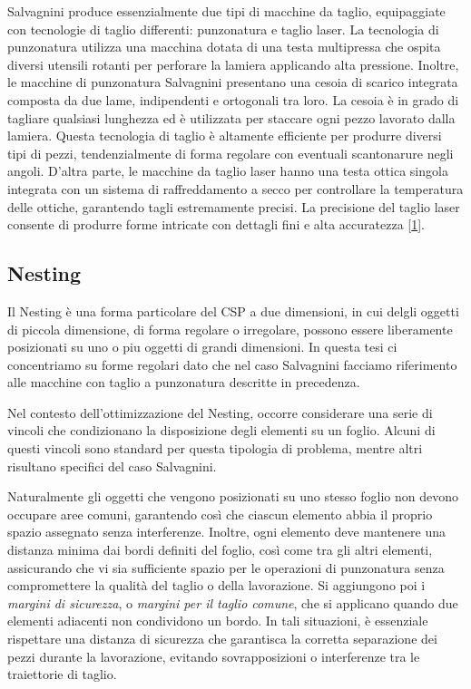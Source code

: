 Salvagnini produce essenzialmente due tipi di macchine da taglio, equipaggiate con tecnologie di taglio differenti: punzonatura e taglio laser. La tecnologia di punzonatura utilizza una macchina dotata di una testa multipressa che ospita diversi utensili rotanti per perforare la lamiera applicando alta pressione. Inoltre, le macchine di punzonatura Salvagnini presentano una cesoia di scarico integrata composta da due lame, indipendenti e ortogonali tra loro. La cesoia è in grado di tagliare qualsiasi lunghezza ed è utilizzata per staccare ogni pezzo lavorato dalla lamiera. Questa tecnologia di taglio è altamente efficiente per produrre diversi tipi di pezzi, tendenzialmente di forma regolare con eventuali scantonarure negli angoli. D'altra parte, le macchine da taglio laser hanno una testa ottica singola integrata con un sistema di raffreddamento a secco per controllare la temperatura delle ottiche, garantendo tagli estremamente precisi. La precisione del taglio laser consente di produrre forme intricate con dettagli fini e alta accuratezza [\hyperlink{bibliografia}{1}].


\subsection{Nesting}

Il Nesting è una forma particolare del CSP a due dimensioni, in cui delgli oggetti di piccola dimensione, di forma regolare o irregolare, possono essere liberamente posizionati su uno o piu oggetti di grandi dimensioni. In questa tesi ci concentriamo su forme regolari dato che nel caso Salvagnini facciamo riferimento alle macchine con taglio a punzonatura descritte in precedenza. 

Nel contesto dell’ottimizzazione del Nesting, occorre considerare una serie di vincoli che condizionano la disposizione degli elementi su un foglio. Alcuni di questi vincoli sono standard per questa tipologia di problema, mentre altri risultano specifici del caso Salvagnini. 

Naturalmente gli oggetti che vengono posizionati su uno stesso foglio non devono occupare aree comuni, garantendo così che ciascun elemento abbia il proprio spazio assegnato senza interferenze. Inoltre, ogni elemento deve mantenere una distanza minima dai bordi definiti del foglio, così come tra gli altri elementi, assicurando che vi sia sufficiente spazio per le operazioni di punzonatura senza compromettere la qualità del taglio o della lavorazione. Si aggiungono poi i \emph{margini di sicurezza}\glsfirstoccur, o \emph{margini per il taglio comune}\glsfirstoccur, che si applicano quando due elementi adiacenti non condividono un bordo. In tali situazioni, è essenziale rispettare una distanza di sicurezza che garantisca la corretta separazione dei pezzi durante la lavorazione, evitando sovrapposizioni o interferenze tra le traiettorie di taglio.

